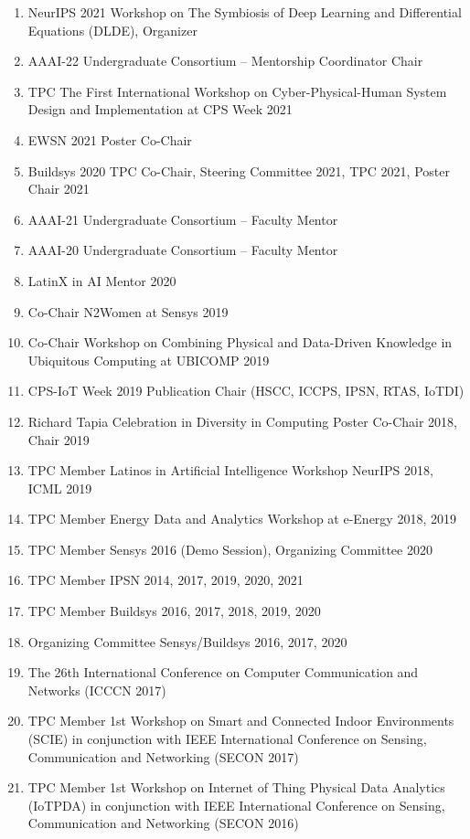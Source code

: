 \documentclass[12pt]{article}
\begin{document}
\begin{enumerate}
    \item NeurIPS 2021 Workshop on The Symbiosis of Deep Learning and Differential Equations (DLDE), Organizer
    \item AAAI-22 Undergraduate Consortium -- Mentorship Coordinator Chair
    \item TPC The First International Workshop on Cyber-Physical-Human System Design and Implementation at CPS Week 2021
    \item EWSN 2021 Poster Co-Chair
    \item Buildsys 2020 TPC Co-Chair, Steering Committee 2021, TPC 2021, Poster Chair 2021
    \item AAAI-21 Undergraduate Consortium -- Faculty Mentor
    \item AAAI-20 Undergraduate Consortium -- Faculty Mentor
    \item LatinX in AI Mentor 2020
    \item Co-Chair N2Women at Sensys 2019
    \item Co-Chair Workshop on Combining Physical and Data-Driven Knowledge in Ubiquitous Computing at UBICOMP 2019
    \item CPS-IoT Week 2019 Publication Chair (HSCC, ICCPS, IPSN, RTAS, IoTDI)
    \item Richard Tapia Celebration in Diversity in Computing Poster Co-Chair 2018, Chair 2019
    \item TPC Member Latinos in Artificial Intelligence Workshop NeurIPS 2018, ICML 2019
    \item TPC Member Energy Data and Analytics Workshop at e-Energy 2018, 2019
    \item TPC Member Sensys 2016 (Demo Session), Organizing Committee 2020
    \item TPC Member IPSN 2014, 2017, 2019, 2020, 2021
    \item TPC Member Buildsys 2016, 2017, 2018, 2019, 2020
    \item Organizing Committee Sensys/Buildsys 2016, 2017, 2020
    \item The 26th International Conference on Computer Communication and Networks (ICCCN 2017)
    \item TPC Member 1st Workshop on Smart and Connected Indoor Environments (SCIE) in conjunction with IEEE International Conference on Sensing, Communication and Networking (SECON 2017)
    \item TPC Member 1st Workshop on Internet of Thing Physical Data Analytics (IoTPDA) in conjunction with IEEE International Conference on Sensing, Communication and Networking (SECON 2016)

\end{enumerate}
\end{document}
